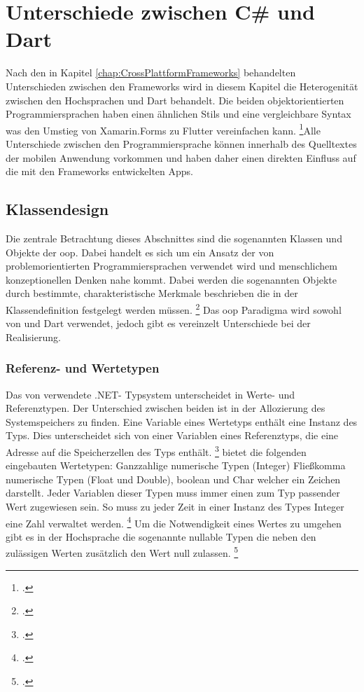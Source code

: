 \chapter{Unterschiede zwischen C\# und Dart}
\label{chap:Programmiersprachen}

Nach den in Kapitel \ref{chap:CrossPlattformFrameworks} behandelten Unterschieden zwischen den Frameworks wird in diesem Kapitel die Heterogenität zwischen den Hochsprachen \Csharp und Dart behandelt.  Die beiden objektorientierten Programmiersprachen haben einen ähnlichen Stils und eine vergleichbare Syntax was den Umstieg von Xamarin.Forms zu Flutter vereinfachen kann.  \footcite[Vgl. ][Abgerufen am \today]{Pedley2019}Alle Unterschiede zwischen den Programmiersprache können innerhalb des Quelltextes der mobilen Anwendung vorkommen und haben daher einen direkten Einfluss auf die mit den Frameworks entwickelten Apps.

\section{Klassendesign}

Die zentrale Betrachtung dieses Abschnittes sind die sogenannten Klassen und Objekte der \ac{oop}.  Dabei handelt es sich um ein Ansatz der von problemorientierten Programmiersprachen verwendet wird und menschlichem konzeptionellen Denken nahe kommt.  Dabei werden die sogenannten Objekte durch bestimmte,  charakteristische Merkmale beschrieben  die in der Klassendefinition festgelegt werden müssen. \footcite[Vgl.][S. 11f.]{Witte2013} Das \ac{oop} Paradigma wird sowohl von \Csharp und Dart verwendet,  jedoch gibt es vereinzelt Unterschiede bei der Realisierung. 

\subsection{Referenz- und Wertetypen}

Das von \Csharp verwendete .NET- Typsystem unterscheidet in Werte- und Referenztypen.  Der Unterschied zwischen beiden ist in der Allozierung des Systemspeichers zu finden.  Eine Variable eines Wertetyps enthält eine Instanz des Typs.  Dies unterscheidet sich von einer Variablen eines Referenztyps, die eine Adresse auf die Speicherzellen des Typs enthält. \footcite[Vgl.][S. 155f.]{Kühnel2019} \Csharp bietet die folgenden eingebauten Wertetypen: Ganzzahlige numerische Typen (Integer) Fließkomma numerische Typen (Float und Double), boolean und Char welcher ein Zeichen darstellt.  Jeder Variablen dieser Typen muss immer einen zum Typ passender Wert zugewiesen sein.  So muss zu jeder Zeit in einer Instanz des Types Integer eine Zahl verwaltet werden. \footcite[Vgl. ][Abgerufen am \today]{MicrosoftValueTypes2020} Um die Notwendigkeit eines Wertes zu umgehen gibt es in der Hochsprache die sogenannte nullable Typen die neben den zulässigen Werten zusätzlich den Wert null zulassen. \footcite[Vgl.][S. 167]{Bayer2008} 

